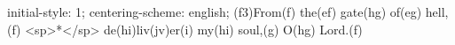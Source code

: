 initial-style: 1;
centering-scheme: english;
(f3)From(f) the(ef) gate(hg) of(eg) hell,(f) <sp>*</sp> de(hi)liv(jv)er(i) my(hi) soul,(g) O(hg) Lord.(f)
